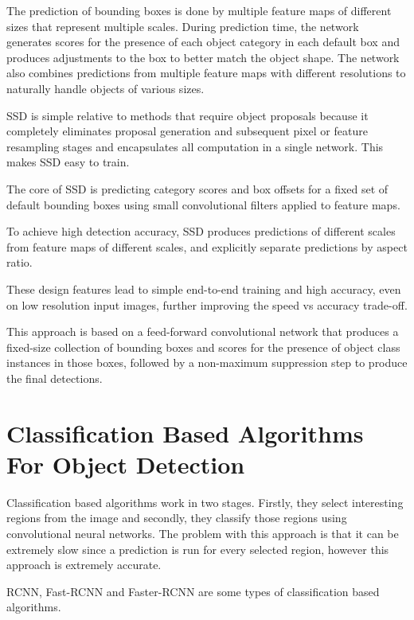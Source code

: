     \par The prediction of bounding boxes is done by multiple feature maps of different sizes that represent multiple scales. During prediction time, the network generates scores for the presence of each object category in each default box and produces adjustments to the box to better match the object shape. The network also combines predictions from multiple feature maps with different resolutions to naturally handle objects of various sizes.
    \par SSD is simple relative to methods that require object proposals because it completely eliminates proposal generation and subsequent pixel or feature resampling stages and encapsulates all computation in a single network. This makes SSD easy to train.
    \par The core of SSD is predicting category scores and box offsets for a fixed set of default bounding boxes using small convolutional filters applied to feature maps.
    \par To achieve high detection accuracy, SSD produces predictions of different scales from feature maps of different scales, and explicitly separate predictions by aspect ratio.
    \par These design features lead to simple end-to-end training and high accuracy, even on low resolution input images, further improving the speed vs accuracy trade-off.
    \par This approach is based on a feed-forward convolutional network that produces a fixed-size collection of bounding boxes and scores for the presence of object class instances in those boxes, followed by a non-maximum suppression step to produce the final detections. \cite{Liu2016}
   
   

\section{Classification Based Algorithms For Object Detection}
\label{sec:classification}

\par Classification based algorithms work in two stages. Firstly, they select interesting regions from the image and secondly, they classify those regions using convolutional neural networks. The problem with this approach is that it can be extremely slow since a prediction is run for every selected region, however this approach is extremely accurate. \cite{Lin2017} 
\par RCNN, Fast-RCNN and Faster-RCNN are some types of classification based algorithms.  

